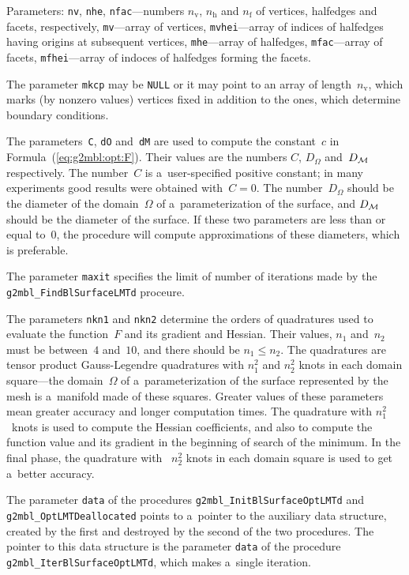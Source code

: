Parameters: \texttt{nv}, \texttt{nhe}, \texttt{nfac}---numbers
$n_{\mathrm{v}}$, $n_{\mathrm{h}}$ and $n_{\mathrm{f}}$ of vertices,
halfedges and facets, respectively, \texttt{mv}---array of vertices,
\texttt{mvhei}---array of indices of halfedges having origins at subsequent
vertices, \texttt{mhe}---array of halfedges, \texttt{mfac}---array of
facets, \texttt{mfhei}---array of indoces of halfedges forming the facets.

The parameter \texttt{mkcp} may be \texttt{NULL} or it may point to an array
of length~$n_{\mathrm{v}}$, which marks (by nonzero values) vertices fixed
in addition to the ones, which determine boundary conditions.

The parameters~\texttt{C}, \texttt{dO} and~\texttt{dM} are used to compute
the constant~$c$ in Formula~(\ref{eq:g2mbl:opt:F}). Their values are the
numbers $C$, $D_{\varOmega}$ and~$D_{\cal M}$ respectively. The number~$C$
is a~user-specified positive constant; in many experiments good results were
obtained with~$C=0$. The number~$D_{\varOmega}$ should be the diameter of
the domain~$\varOmega$ of a~parameterization of the surface, and $D_{\cal M}$
should be the diameter of the surface. If these two parameters are less than
or equal to~$0$, the procedure will compute approximations of these diameters,
which is preferable.

The parameter \texttt{maxit} specifies the limit of number of iterations
made by the \texttt{g2mbl\_FindBlSurfaceLMTd} proceure.

The parameters \texttt{nkn1} and \texttt{nkn2} determine the orders of
quadratures used to evaluate the function~$F$ and its gradient and Hessian.
Their values, $n_1$ and~$n_2$ must be between~$4$ and~$10$, and there should be
$n_1\leq n_2$. The quadratures are tensor product Gauss-Legendre
quadratures with $n_1^2$ and $n_2^2$ knots in each domain square---the
domain~$\varOmega$ of a~parameterization of the surface represented by the
mesh is a~manifold made of these squares. Greater values of these parameters
mean greater accuracy and longer computation times. The quadrature with
$n_1^2$~knots is used to compute the Hessian coefficients, and also to
compute the function value and its gradient in the beginning of search of
the minimum. In the final phase, the quadrature  with ~$n_2^2$ knots in each
domain square is used to get a~better accuracy.

\begin{sloppypar}
The parameter \texttt{data} of the procedures
\texttt{g2mbl\_InitBlSurfaceOptLMTd} and \texttt{g2mbl\_OptLMTDeallocated}
points to a~pointer to the auxiliary data structure, created by the first
and destroyed by the second of the two procedures. The pointer to this data
structure is the parameter \texttt{data} of the procedure
\texttt{g2mbl\_IterBlSurfaceOptLMTd}, which makes a~single iteration.%
\end{sloppypar}

